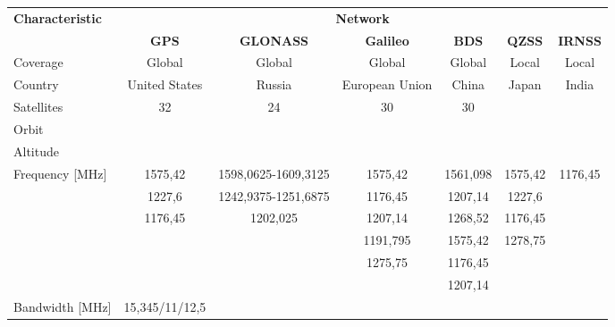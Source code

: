\begin{table}[!h]
    \centering
    \begin{tabular}{lcccccc}
        \toprule[1.5pt]
        \multirow{2}{*}{\textbf{Characteristic}} & \multicolumn{6}{c}{\textbf{Network}} \\
                                                 & \textbf{GPS} & \textbf{GLONASS} & \textbf{Galileo} & \textbf{BDS} & \textbf{QZSS} & \textbf{IRNSS} \\
        \midrule
        Coverage                         & Global            & Global                       & Global               & Global         & Local   & Local \\
        Country                          & United States     & Russia                       & European Union       & China          & Japan   & India \\
        Satellites                       & 32                & 24                           & 30                   & 30             &         &  \\
        Orbit                            &                   &                              &                      &                &         &  \\
        Altitude                         &                   &                              &                      &                &         &  \\
        \multirow{6}{*}{Frequency [MHz]} & 1575,42           & 1598,0625-1609,3125          & 1575,42              & 1561,098       & 1575,42 & 1176,45 \\
                                         & 1227,6            & 1242,9375-1251,6875          & 1176,45              & 1207,14        & 1227,6  &  \\
                                         & 1176,45           & 1202,025                     & 1207,14              & 1268,52        & 1176,45 &  \\
                                         &                   &                              & 1191,795             & 1575,42        & 1278,75 &  \\
                                         &                   &                              & 1275,75              & 1176,45        &         &  \\
                                         &                   &                              &                      & 1207,14        &         &  \\
        Bandwidth [MHz]                  & 15,345/11/12,5    &                              &                      &                &         &  \\

\end{tabular}
\end{table}
